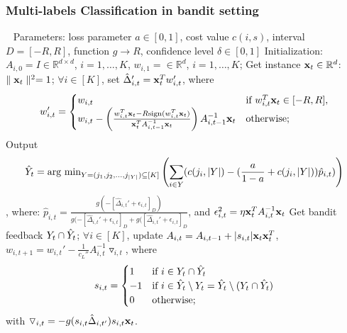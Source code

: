 \subsubsection*{Multi-labels Classification in bandit setting}
\begin{algo}
\label{algo:MLBgentile}
\begin{algorithmic}
\STATE	$\ \ $
\STATE	Parameters: loss parameter $a \in[0,1]$, cost value $c(i,s)$, interval $D = [-R,R]$, function $g\rightarrow R$, confidence level $\delta\in[0,1]$
\STATE	Initialization: $A_{i,0} = I\in \mathbb{R}^{d\times d}$, $i=1,\dots,K$, $w_{i,1} = \in \mathbb{R}^d$, $i=1,\dots,K$;
	\STATE	Get instance $\mathbf{x}_t\in\mathbb{R}^d$: $\parallel{\mathbf{x}_t}\parallel^2 = 1$;
    \STATE	$\forall i\in[K]$, set $\hat{\Delta}_{i,t}' = \mathbf{x}_t^Tw_{i,t}'$, where
    \[w_{i,t}' = \begin{cases} w_{i,t} & \text{if } w_{i,t}^T\mathbf{x}_t\in[-R,R],\\
    w_{i,t} - \left(\frac{w_{i,t}^T\mathbf{x}_t-R \text{sign} (w_{i,t}^T\mathbf{x}_t)}{\mathbf{x}_t^TA_{i,t-1}^{-1}\mathbf{x}_t}\right) A_{i,t-1}^{-1}\mathbf{x}_t & \text{otherwise};
\end{cases}\]
	\STATE	Output 
    \[\hat{Y}_t = \text{arg min}_{Y = (j_1,j_2,\dots,j_{|Y|})\subseteq[K]}\left( \sum_{i\in Y}(c(j_i,|Y|)-(\frac{a}{1-a}+c(j_i,|Y|))\hat{p}_{i,t})\right)\], where: $\hat{p}_{i,t} = \frac{g(-[\hat{\Delta}_{i,t}'+\epsilon_{i,t}]_D)}{g(-[\hat{\Delta}_{i,t}'+\epsilon_{i,t}]_D+g([\hat{\Delta}_{i,t}'+\epsilon_{i,t}]_D}$, and $\epsilon_{i,t}^2 = \eta \mathbf{x}_t^TA_{i,t}^{-1}\mathbf{x}_t$
    \STATE	Get bandit feedback $Y_t\cap\hat{Y}_t$;
    \STATE	$\forall i\in[K]$, update $A_{i,t} = A_{i,t-1}+|s_{i,t}|\mathbf{x}_t\mathbf{x}_t^T$, $w_{i,t+1} = w_{i,t}' - \frac{1}{c_L''}A_{i,t}^{-1}\triangledown_{i,t}$, where 
    \[s_{i,t} = \begin{cases}
1 & \text{if } i\in Y_t\cap\hat{Y}_t \\
-1 & \text{if } i\in\hat{Y}_t\setminus Y_t = \hat{Y}_t\setminus(Y_t\cap\hat{Y}_t)\\
0 & \text{otherwise};
\end{cases}\]
	\STATE	with $\triangledown_{i,t} = -g(s_{i,t}\hat{\Delta}_{i,t'})s_{i,t}\mathbf{x}_t$.
\ENDFOR
\end{algorithmic}
\end{algo}
